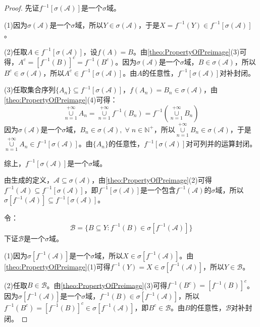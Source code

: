 \begin{proof}
	先证$f^{-1}[\sigma(\mathscr{A})]$是一个$\sigma$域。\par
	(1)因为$\sigma(\mathscr{A})$是一个$\sigma$域，所以$Y\in\sigma(\mathscr{A})$，于是$X=f^{-1}(Y)\in f^{-1}[\sigma(\mathscr{A})]$。\par
	(2)任取$A\in f^{-1}[\sigma(\mathscr{A})]$，设$f(A)=B$。由\cref{theo:PropertyOfPreimage}(3)可得，$A^c=[f^{-1}(B)]^c=f^{-1}(B^c)$。因为$\sigma(\mathscr{A})$是一个$\sigma$域，$B\in\sigma(\mathscr{A})$，所以$B^c\in\sigma(\mathscr{A})$，所以$A^c\in f^{-1}[\sigma(\mathscr{A})]$。由$A$的任意性，$f^{-1}[\sigma(\mathscr{A})]$对补封闭。\par
	(3)任取集合序列$\{A_n\}\subseteq f^{-1}[\sigma(\mathscr{A})]$，$f(A_n)=B_n\in\sigma(\mathscr{A})$，由\cref{theo:PropertyOfPreimage}(4)可得：
	\begin{equation*}
		\underset{n=1}{\overset{+\infty}{\cup}}A_n=\underset{n=1}{\overset{+\infty}{\cup}}f^{-1}(B_n)=f^{-1}\left(\underset{n=1}{\overset{+\infty}{\cup}}B_n\right)
	\end{equation*}
	因为$\sigma(\mathscr{A})$是一个$\sigma$域，$B_n\in\sigma(\mathscr{A}),\;\forall\;n\in\mathbb{N}^+$，所以$\underset{n=1}{\overset{+\infty}{\cup}}B_n\in\sigma(\mathscr{A})$，于是$\underset{n=1}{\overset{+\infty}{\cup}}A_n\in f^{-1}[\sigma(\mathscr{A})]$。由$\{A_n\}$的任意性，$f^{-1}[\sigma(\mathscr{A})]$对可列并的运算封闭。\par
	综上，$f^{-1}[\sigma(\mathscr{A})]$是一个$\sigma$域。\par
	由生成的定义，$\mathscr{A}\subseteq\sigma(\mathscr{A})$，由\cref{theo:PropertyOfPreimage}(2)可得$f^{-1}(\mathscr{A})\subseteq f^{-1}[\sigma(\mathscr{A})]$，即$f^{-1}[\sigma(\mathscr{A})]$是一个包含$f^{-1}(\mathscr{A})$的$\sigma$域，所以$\sigma[f^{-1}(\mathscr{A})]\subseteq f^{-1}[\sigma(\mathscr{A})]$。\par
	令：
	\begin{equation*}
		\mathscr{B}=\{B\subseteq Y:f^{-1}(B)\in \sigma[f^{-1}(\mathscr{A})]\}
	\end{equation*}
	下证$\mathscr{B}$是一个$\sigma$域。\par
	(1)因为$\sigma[f^{-1}(\mathscr{A})]$是一个$\sigma$域，所以$X\in\sigma[f^{-1}(\mathscr{A})]$。由\cref{theo:PropertyOfPreimage}(1)可得$f^{-1}(Y)=X\in\sigma[f^{-1}(\mathscr{A})]$，所以$Y\in\mathscr{B}$。\par
	(2)任取$B\in\mathscr{B}$。由\cref{theo:PropertyOfPreimage}(3)可得$f^{-1}(B^c)=[f^{-1}(B)]^c$。因为$\sigma[f^{-1}(\mathscr{A})]$是一个$\sigma$域，$f^{-1}(B)\in\sigma[f^{-1}(\mathscr{A})]$，所以$f^{-1}(B^c)=[f^{-1}(B)]^c\in\sigma[f^{-1}(\mathscr{A})]$，即$B^c\in\mathscr{B}$。由$B$的任意性，$\mathscr{B}$对补封闭。\par

\end{proof}
